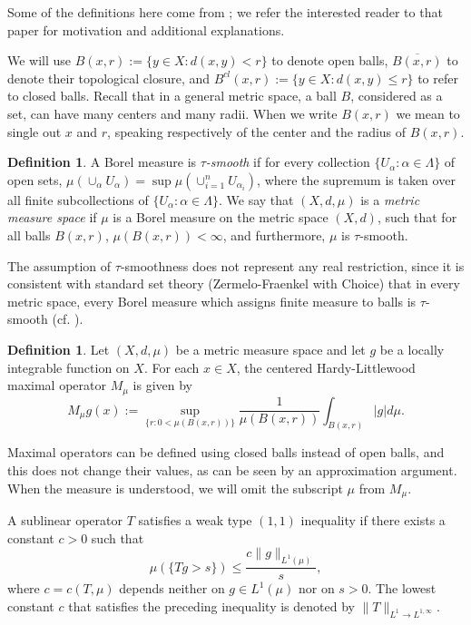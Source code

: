 \documentclass[12pt]{amsart}
\theoremstyle{definition}
\newtheorem{definition}[theorem]{Definition}
\theoremstyle{parrafo}
\begin{document}
Some of the definitions here  come from 
\cite{A2}; we refer the interested reader to that paper for motivation and additional explanations.


We will use $B(x,r) := \{y\in X: d(x,y) < r\}$ to denote open balls, 
$\overline{B(x,r)}$ to denote their topological closure, and 
$B^{cl}(x,r) := \{y\in X: d(x,y) \le r\}$ to refer to closed balls.
Recall that in a general metric space,  a ball $B$, considered as a set, can have many centers and many radii. When
we write $B(x,r)$ we mean to single out $x$ and $r$, speaking respectively of the center and the radius 
of $B(x,r)$.


\begin{definition} A Borel measure is {\em $\tau$-smooth} if for every
collection  $\{U_\alpha : \alpha \in \Lambda\}$
 of  open sets, $\mu (\cup_\alpha U_\alpha) = \sup \mu(\cup_{i=1}^nU_{\alpha_i})$,
 where the supremum is taken over all finite subcollections of $\{U_\alpha : \alpha \in \Lambda\}$.
 We say that $(X, d, \mu)$ is a {\em metric measure space} if
$\mu$ is a Borel measure on the metric space $(X, d)$, such that for all
balls $B(x,r)$, $\mu (B(x,r)) < \infty$, and furthermore, $\mu$ is $\tau$-smooth. 
\end{definition} 

The assumption of $\tau$-smoothness does not represent any real restriction, since it is consistent with standard set theory
(Zermelo-Fraenkel with Choice) that  in every metric space, every Borel measure  which
assigns finite measure to balls  is $\tau$-smooth 
(cf. \cite[Theorem (a), pg. 59]{Fre}).  

\begin{definition}\label{maxfun} Let $(X, d, \mu)$ be a metric measure space and let $g$ be  a locally integrable function 
on $X$. For each  $x\in X$, the centered Hardy-Littlewood maximal operator $M_{\mu}$ 
 is given by
\begin{equation}\label{HLMFc}
M_{\mu} g(x) := \sup _{\{r : 0 < \mu (B(x, r))\}}  \frac{1}{\mu
(B(x, r))} \int _{B(x, r)}  |g| d\mu.
\end{equation}
\end{definition}


Maximal operators can be defined using closed balls instead of open balls,
and this does not change their values, as can be seen by an approximation argument.
 When
the measure is understood, we will omit the subscript $\mu$  from  $M_\mu$.

A sublinear operator $T$ satisfies a
weak type $(1,1)$ inequality if there exists a constant $c > 0$ such that
\begin{equation}\label{weaktype}
\mu (\{T g > s \}) \le \frac{c \|g\|_{L^1(\mu)}}{s },
\end{equation}
where $c=c(T,  \mu)$ depends neither on $g\in L^1 (\mu)$
nor on $s > 0$. The lowest constant $c$ that satisfies the preceding
inequality is denoted by $\|T\|_{L^1\to L^{1, \infty}}$.
\end{document}
